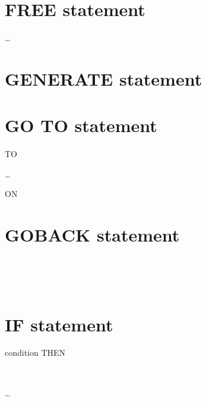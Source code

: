 \section{FREE statement}

\begin{1=}
  \identifier
\end{1=} \ldots

\section{GENERATE statement}


\section{GO TO statement}

 TO
\begin{1=}
  \procedurename
\end{1=} \ldots
\begin{0-1}
   ON \identifier
\end{0-1}

\section{GOBACK statement}

\begin{0-1}
  \begin{1=}
     \\
  \end{1=}
  \begin{1=}
    \identifier \\
    \literal
  \end{1=}
\end{0-1}

\section{IF statement}

 condition THEN
\begin{1=}
  \imperativestatement \\
   \imperativestatement
\end{1=} \ldots

\begin{0-1}
\end{0-1}

